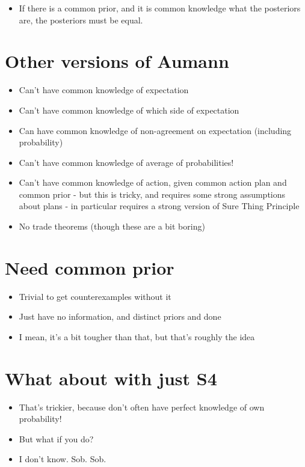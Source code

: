 \begin{itemize}
\item{} If there is a common prior, and it is common knowledge what the posteriors are, the posteriors must be equal.

\end{itemize}

\section{Other versions of Aumann}
\label{otherversionsofaumann}

\begin{itemize}
\item{} Can't have common knowledge of expectation

\item{} Can't have common knowledge of which side of expectation

\item{} Can have common knowledge of non-agreement on expectation (including probability)

\item{} Can't have common knowledge of average of probabilities!

\item{} Can't have common knowledge of action, given common action plan and common prior - but this is tricky, and requires some strong assumptions about plans - in particular requires a strong version of Sure Thing Principle

\item{} No trade theorems (though these are a bit boring)

\end{itemize}

\section{Need common prior}
\label{needcommonprior}

\begin{itemize}
\item{} Trivial to get counterexamples without it

\item{} Just have no information, and distinct priors and done

\item{} I mean, it's a bit tougher than that, but that's roughly the idea

\end{itemize}

\section{What about with just S4}
\label{whataboutwithjusts4}

\begin{itemize}
\item{} That's trickier, because don't often have perfect knowledge of own probability!

\item{} But what if you do?

\item{} I don't know. Sob. Sob.

\end{itemize}


